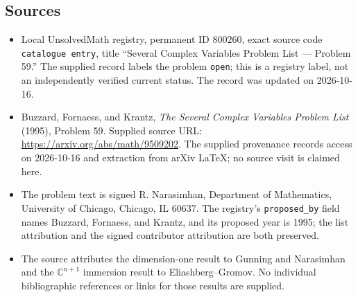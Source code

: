 \documentclass[11pt]{article}
\newcommand{\C}{\mathbb{C}}
\begin{document}
\subsection{Sources}
\begin{itemize}
\item Local UnsolvedMath registry, permanent ID \(800260\), exact source code \texttt{catalogue entry}, title ``Several Complex Variables Problem List --- Problem 59.'' The supplied record labels the problem \texttt{open}; this is a registry label, not an independently verified current status. The record was updated on 2026-10-16.
\item Buzzard, Fornaess, and Krantz, \emph{The Several Complex Variables Problem List} (1995), Problem 59. Supplied source URL: \url{https://arxiv.org/abs/math/9509202}. The supplied provenance records access on 2026-10-16 and extraction from arXiv LaTeX; no source visit is claimed here.
\item The problem text is signed R. Narasimhan, Department of Mathematics, University of Chicago, Chicago, IL 60637. The registry's \texttt{proposed\_by} field names Buzzard, Fornaess, and Krantz, and its proposed year is 1995; the list attribution and the signed contributor attribution are both preserved.
\item The source attributes the dimension-one result to Gunning and Narasimhan and the \(\C^{n+1}\) immersion result to Eliashberg--Gromov. No individual bibliographic references or links for those results are supplied.
\end{itemize}
\end{document}
